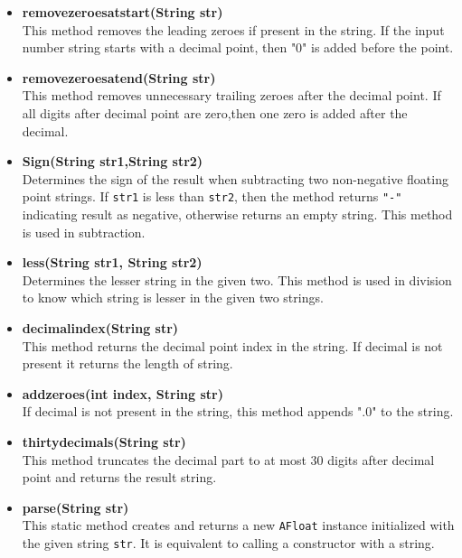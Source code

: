 \documentclass{article}
\begin{document}
\begin{itemize}

    \item \textbf{removezeroesatstart(String str)} \\
    This method removes the leading zeroes if present in the string. If the input number string starts with a decimal point, then "0" is added before the point.

    \item \textbf{removezeroesatend(String str)} \\
    This method removes unnecessary trailing zeroes after the decimal point. If all digits after decimal point are zero,then one zero is added after the decimal.

    \item \textbf{Sign(String str1,String str2)} \\
    Determines the sign of the result when subtracting two non-negative floating point strings. If \texttt{str1} is less than \texttt{str2}, then the method returns \texttt{"-"} indicating result as negative, otherwise returns an empty string. This method is used in subtraction.

    \item \textbf{less(String str1, String str2)} \\
    Determines the lesser string in the given two. This method is used in division to know which string is lesser in the given two strings.

    \item \textbf{decimalindex(String str)} \\
    This method returns the decimal point index in the string. If decimal is not present it returns the length of string.

    \item \textbf{addzeroes(int index, String str)} \\
    If decimal is not present in the string, this method appends ".0" to the string.

     \item \textbf{thirtydecimals(String str)} \\
    This method truncates the decimal part to at most 30 digits after decimal point and returns the result string.

    \item \textbf{parse(String str)} \\
    This static method creates and returns a new \texttt{AFloat} instance initialized with the given string \texttt{str}. It is equivalent to calling a constructor with a string.


\end{itemize}
\end{document}
